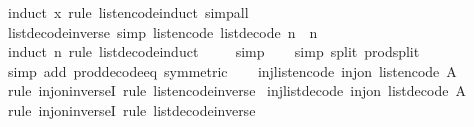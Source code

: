 \begin{isabellebody}
%
\isatagproof
{}\isamarkupfalse%
\ {\isacharparenleft}induct\ x\ rule{\isacharcolon}\ list{\isacharunderscore}encode{\isachardot}induct{\isacharparenright}\ simp{\isacharunderscore}all%
\endisatagproof
{\isafoldproof}%
%
\isadelimproof
\isanewline
%
\endisadelimproof
\isanewline
{}\isamarkupfalse%
\ list{\isacharunderscore}decode{\isacharunderscore}inverse\ {\isacharbrackleft}simp{\isacharbrackright}{\isacharcolon}\ {\isachardoublequoteopen}list{\isacharunderscore}encode\ {\isacharparenleft}list{\isacharunderscore}decode\ n{\isacharparenright}\ {\isacharequal}\ n{\isachardoublequoteclose}\isanewline
%
\isadelimproof
\ \ %
\endisadelimproof
%
\isatagproof
{}\isamarkupfalse%
\ {\isacharparenleft}induct\ n\ rule{\isacharcolon}\ list{\isacharunderscore}decode{\isachardot}induct{\isacharparenright}\isanewline
\ \ \ \isamarkupfalse%
\ simp\isanewline
\ \ \isamarkupfalse%
\ {\isacharparenleft}simp\ split{\isacharcolon}\ prod{\isachardot}split{\isacharparenright}\isanewline
\ \ \isamarkupfalse%
\ {\isacharparenleft}simp\ add{\isacharcolon}\ prod{\isacharunderscore}decode{\isacharunderscore}eq\ {\isacharbrackleft}symmetric{\isacharbrackright}{\isacharparenright}\isanewline
\ \ \isamarkupfalse%
%
\endisatagproof
{\isafoldproof}%
%
\isadelimproof
\isanewline
%
\endisadelimproof
\isanewline
{}\isamarkupfalse%
\ inj{\isacharunderscore}list{\isacharunderscore}encode{\isacharcolon}\ {\isachardoublequoteopen}inj{\isacharunderscore}on\ list{\isacharunderscore}encode\ A{\isachardoublequoteclose}\isanewline
%
\isadelimproof
\ \ %
\endisadelimproof
%
\isatagproof
{}\isamarkupfalse%
\ {\isacharparenleft}rule\ inj{\isacharunderscore}on{\isacharunderscore}inverseI{\isacharparenright}\ {\isacharparenleft}rule\ list{\isacharunderscore}encode{\isacharunderscore}inverse{\isacharparenright}%
\endisatagproof
{\isafoldproof}%
%
\isadelimproof
\isanewline
%
\endisadelimproof
\isanewline
{}\isamarkupfalse%
\ inj{\isacharunderscore}list{\isacharunderscore}decode{\isacharcolon}\ {\isachardoublequoteopen}inj{\isacharunderscore}on\ list{\isacharunderscore}decode\ A{\isachardoublequoteclose}\isanewline
%
\isadelimproof
\ \ %
\endisadelimproof
%
\isatagproof
{}\isamarkupfalse%
\ {\isacharparenleft}rule\ inj{\isacharunderscore}on{\isacharunderscore}inverseI{\isacharparenright}\ {\isacharparenleft}rule\ list{\isacharunderscore}decode{\isacharunderscore}inverse{\isacharparenright}%
\endisatagproof
{\isafoldproof}%
%
\isadelimproof

\end{isabellebody}
